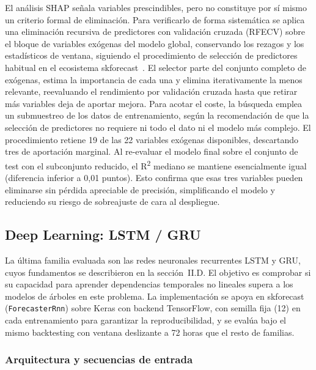 \documentclass[12pt, a4paper]{article}
\begin{document}
El análisis SHAP señala variables prescindibles, pero no constituye por sí mismo un criterio formal de eliminación. Para verificarlo de forma sistemática se aplica una eliminación recursiva de predictores con validación cruzada (RFECV) sobre el bloque de variables exógenas del modelo global, conservando los rezagos y los estadísticos de ventana, siguiendo el procedimiento de selección de predictores habitual en el ecosistema skforecast~\cite{skforecast}. El selector parte del conjunto completo de exógenas, estima la importancia de cada una y elimina iterativamente la menos relevante, reevaluando el rendimiento por validación cruzada hasta que retirar más variables deja de aportar mejora. Para acotar el coste, la búsqueda emplea un submuestreo de los datos de entrenamiento, según la recomendación de que la selección de predictores no requiere ni todo el dato ni el modelo más complejo. El procedimiento retiene 19 de las 22 variables exógenas disponibles, descartando tres de aportación marginal. Al re-evaluar el modelo final sobre el conjunto de test con el subconjunto reducido, el R\textsuperscript{2} mediano se mantiene esencialmente igual (diferencia inferior a 0,01 puntos). Esto confirma que esas tres variables pueden eliminarse sin pérdida apreciable de precisión, simplificando el modelo y reduciendo su riesgo de sobreajuste de cara al despliegue.

\subsection{Deep Learning: LSTM / GRU}

La última familia evaluada son las redes neuronales recurrentes LSTM y GRU, cuyos fundamentos se describieron en la sección~II.D. El objetivo es comprobar si su capacidad para aprender dependencias temporales no lineales supera a los modelos de árboles en este problema. La implementación se apoya en skforecast (\texttt{ForecasterRnn}) sobre Keras con backend TensorFlow, con semilla fija (12) en cada entrenamiento para garantizar la reproducibilidad, y se evalúa bajo el mismo backtesting con ventana deslizante a 72 horas que el resto de familias.

\subsubsection{Arquitectura y secuencias de entrada}
\end{document}

